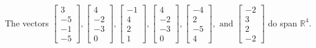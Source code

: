 \begin{exercise}
\begin{exerciseStatement}
  \end{exerciseStatement}
  \begin{exerciseAnswer}
   The vectors \(\left[\begin{array}{r}
3 \\
-5 \\
-1 \\
-5
\end{array}\right] , \left[\begin{array}{r}
4 \\
-2 \\
-3 \\
0
\end{array}\right] , \left[\begin{array}{r}
-1 \\
4 \\
2 \\
1
\end{array}\right] , \left[\begin{array}{r}
4 \\
-2 \\
-3 \\
0
\end{array}\right] , \left[\begin{array}{r}
-4 \\
2 \\
-5 \\
4
\end{array}\right] , \text{ and } \left[\begin{array}{r}
-2 \\
3 \\
2 \\
-2
\end{array}\right]\) 
  	 do  
	span \(\mathbb{R}^4\).
  


  \end{exerciseAnswer}
\end{exercise}